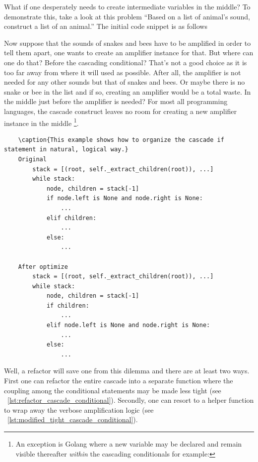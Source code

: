 \documentclass[oneside,11pt]{book}
\theoremstyle{definition}
\theoremstyle{remark}
\begin{document}
What if one desperately needs to create intermediate variables in the middle?
To demonstrate this, take a look at this problem ``Based on a list of animal's sound,
construct a list of an animal.''
The initial code snippet is as follows

Now suppose that the sounds of snakes and bees have to be amplified in order to tell them apart,
one wants to create an amplifier instance for that.
But where can one do that?
Before the cascading conditional?
That's not a good choice as it is too far away from where it will used as possible.
After all, the amplifier is not needed for any other sounds but that of snakes and bees.
Or maybe there is no snake or bee in the list and if so, creating an amplifier would be a total
waste.
In the middle just before the amplifier is needed?
For most all programming languages, the
cascade construct leaves no room for creating a new amplifier instance in the middle
\footnote{An exception is Golang where a new variable may be declared and remain visible
thereafter \emph{within} the cascading conditionals for example:

}.

\begin{verbatim}
    \caption{This example shows how to organize the cascade if statement in natural, logical way.}
    Original
        stack = [(root, self._extract_children(root)), ...]
        while stack:
            node, children = stack[-1]
            if node.left is None and node.right is None:
                ...
            elif children:
                ...
            else:
                ...

    After optimize
        stack = [(root, self._extract_children(root)), ...]
        while stack:
            node, children = stack[-1]
            if children:
                ...
            elif node.left is None and node.right is None:
                ...
            else:
                ...
\end{verbatim}

Well, a refactor will save one from this dilemma and there are at least two ways.
First one can refactor the entire cascade into a separate function where the
coupling among the conditional statements may be made less tight
(see ~\autoref{lst:refactor_cascade_conditional}).
Secondly, one can resort to a helper function to wrap away the verbose amplification logic
(see ~\autoref{lst:modified_tight_cascade_conditional}).
\end{document}
